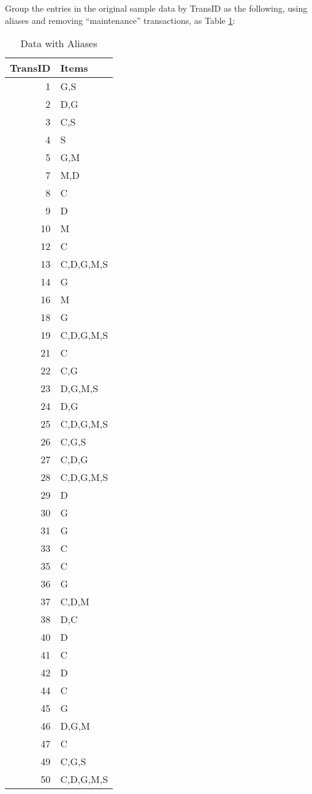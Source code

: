 \documentclass[10pt]{article}
\begin{document}
Group the entries in the original sample data by TransID as the following, using aliases and removing ``maintenance'' transactions, as Table \ref{tbl:aliasdata}:
\begin{table}[htb]
\caption{\label{tbl:aliasdata}Data with Aliases}
\begin{center}
\begin{tabular}{rl}
 TransID  &  Items      \\
\hline
       1  &  G,S        \\
       2  &  D,G        \\
       3  &  C,S        \\
       4  &  S          \\
       5  &  G,M        \\
       7  &  M,D        \\
       8  &  C          \\
       9  &  D          \\
      10  &  M          \\
      12  &  C          \\
      13  &  C,D,G,M,S  \\
      14  &  G          \\
      16  &  M          \\
      18  &  G          \\
      19  &  C,D,G,M,S  \\
      21  &  C          \\
      22  &  C,G        \\
      23  &  D,G,M,S    \\
      24  &  D,G        \\
      25  &  C,D,G,M,S  \\
      26  &  C,G,S      \\
      27  &  C,D,G      \\
      28  &  C,D,G,M,S  \\
      29  &  D          \\
      30  &  G          \\
      31  &  G          \\
      33  &  C          \\
      35  &  C          \\
      36  &  G          \\
      37  &  C,D,M      \\
      38  &  D,C        \\
      40  &  D          \\
      41  &  C          \\
      42  &  D          \\
      44  &  C          \\
      45  &  G          \\
      46  &  D,G,M      \\
      47  &  C          \\
      49  &  C,G,S      \\
      50  &  C,D,G,M,S  \\
\end{tabular}
\end{center}
\end{table}
\end{document}
